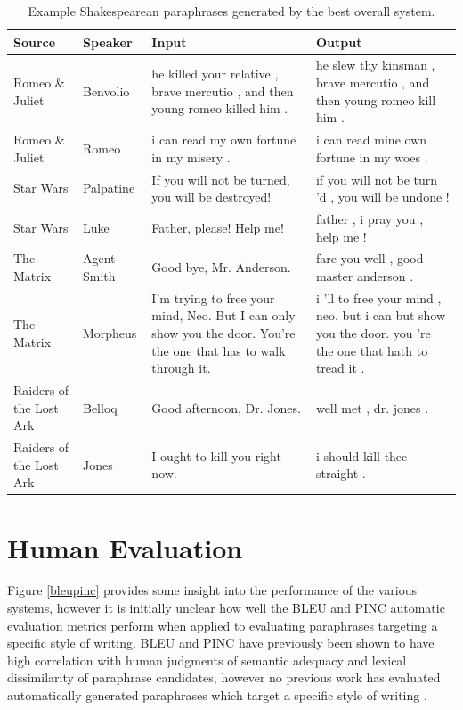 \documentclass[10pt,a5paper,twoside]{article}
\begin{document}
\begin{table}[ht]
  \begin{center}
    \begin{tabular}{|l|l|p{1.4in}|p{1.4in}|}
      \hline
      Source & Speaker & Input & Output \\
      \hline
      \hline
      Romeo \& Juliet & Benvolio & he killed your relative , brave mercutio , and then young romeo killed him . & he slew thy kinsman , brave mercutio , and then young romeo kill him . \\
      \hline
      Romeo \& Juliet & Romeo & i can read my own fortune in my misery . & i can read mine own fortune in my woes . \\
      \hline
      Star Wars & Palpatine & If you will not be turned, you will be destroyed! & if you will not be turn 'd , you will be undone ! \\
      \hline
      Star Wars & Luke & Father, please! Help me! & father , i pray you , help me ! \\    
      \hline
      The Matrix & Agent Smith & Good bye, Mr. Anderson. & fare you well , good master anderson . \\
      \hline
      The Matrix & Morpheus & I'm trying to free your mind, Neo. But I can only show you the door. You're the one that has to walk through it. & i 'll to free your mind , neo. but i can but show you the door. you 're the one that hath to tread it . \\
      \hline
      Raiders of the Lost Ark & Belloq & Good afternoon, Dr. Jones. & well met , dr. jones . \\
      \hline
      Raiders of the Lost Ark & Jones & I ought to kill you right now. & i should kill thee straight . \\
      \hline
    \end{tabular}
  \end{center}
  \caption{Example Shakespearean paraphrases generated by the best overall system.}
  \label{examples}
\end{table}

\section{Human Evaluation}
\label{human_evaluation}
Figure \ref{bleupinc} provides some insight into the performance of the various systems, however it is initially unclear how well the BLEU and PINC
automatic evaluation metrics perform when applied to evaluating paraphrases targeting a specific style of writing.  BLEU and PINC have previously
been shown to have high correlation with human judgments of semantic adequacy and lexical dissimilarity of paraphrase candidates, however no
previous work has evaluated automatically generated paraphrases which target a specific style of writing \cite{chen11}.
\end{document}
